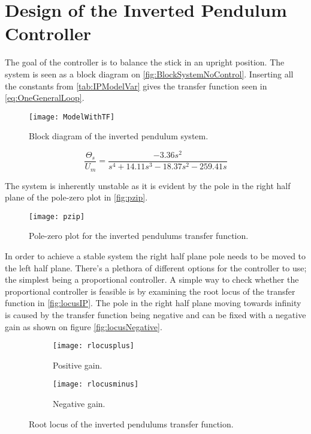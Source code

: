 \graphicspath{{figures/Design/IPController/}}
\chapter{Design of the Inverted Pendulum Controller}\label{sec:IPController}

The goal of the controller is to balance the stick in an upright position. The system is seen as a block diagram on \autoref{fig:BlockSystemNoControl}. Inserting all the constants from \autoref{tab:IPModelVar} gives the transfer function seen in \autoref{eq:OneGeneralLoop}.
\begin{figure}[htbp]
\centering
\texttt{[image: ModelWithTF]}
\caption{Block diagram of the inverted pendulum system.}
\label{fig:BlockSystemNoControl}
\end{figure}

\begin{equation}\label{eq:OneGeneralLoop}
\frac{\Theta_s}{U_m}=\frac{-3.36 s^2}{s^4 + 14.11 s^3 - 18.37 s^2 - 259.41 s}
\end{equation}

The system is inherently unstable as it is evident by the pole in the right half plane of the pole-zero plot in \autoref{fig:pzip}.
\begin{figure}[htbp]
\centering
\texttt{[image: pzip]}
\caption{Pole-zero plot for the inverted pendulums transfer function.}
\label{fig:pzip}
\end{figure}

In order to achieve a stable system the right half plane pole needs to be moved to the left half plane.
\newpage
There's a plethora of different options for the controller to use; the simplest being a proportional controller. A simple way to check whether the proportional controller is feasible is by examining the root locus of the transfer function in \autoref{fig:locusIP}. The pole in the right half plane moving towards infinity is caused by the transfer function being negative and can be fixed with a negative gain as shown on figure \autoref{fig:locusNegative}.
\begin{figure}[htbp]
\centering
	\begin{subfigure}{0.45\textwidth}
	\texttt{[image: rlocusplus]}
	\caption{Positive gain.}
	\label{fig:locusIP}
	\end{subfigure}
	\begin{subfigure}{0.45\textwidth}
	\centering
	\texttt{[image: rlocusminus]}
	\caption{Negative gain.}
	\label{fig:locusNegative}
	\end{subfigure}
\caption{Root locus of the inverted pendulums transfer function.}
\end{figure}

